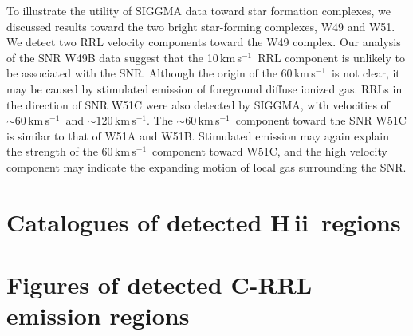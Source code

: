 \documentclass[manuscript]{aastex61}
\newcommand{\hii}{{\rm H\,}{{\sc ii}}}
\newcommand{\kms}{\,km\,s$^{-1}$}
\begin{document}
To illustrate the utility of SIGGMA data toward star formation complexes, we discussed results toward the two bright star-forming complexes, W49 and W51.
We detect two RRL velocity components toward the W49 complex.  Our analysis of the SNR W49B data suggest that the 10\kms\ RRL component is unlikely to be associated with the SNR.
Although the origin of the 60\kms\ is not clear, it may be caused by stimulated emission of foreground diffuse ionized gas.
RRLs in the direction of SNR W51C were also detected by SIGGMA, with velocities of $\sim60$\kms\ and $\sim120$\kms.
The $\sim60$\kms\ component toward the SNR W51C is similar to that of W51A and W51B.
Stimulated emission may again explain the strength of the 60\kms\ component toward W51C, and
the high velocity component may indicate the expanding motion of local gas surrounding the SNR.

\acknowledgments
\newpage
\appendix

\section{Catalogues of detected \hii\ regions}\label{appe:cata}


\newpage

\section{Figures of detected C-RRL emission regions}\label{appe:crrl}
\end{document}
